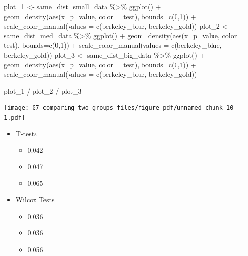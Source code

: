 \documentclass[
  letterpaper,
  DIV=11,
  numbers=noendperiod]{scrreprt}
\newenvironment{Shaded}{\begin{snugshade}}{\end{snugshade}}
\newcommand{\AttributeTok}[1]{\textcolor[rgb]{0.40,0.45,0.13}{#1}}
\newcommand{\DecValTok}[1]{\textcolor[rgb]{0.68,0.00,0.00}{#1}}
\newcommand{\FunctionTok}[1]{\textcolor[rgb]{0.28,0.35,0.67}{#1}}
\newcommand{\NormalTok}[1]{\textcolor[rgb]{0.00,0.23,0.31}{#1}}
\newcommand{\OtherTok}[1]{\textcolor[rgb]{0.00,0.23,0.31}{#1}}
\newcommand{\SpecialCharTok}[1]{\textcolor[rgb]{0.37,0.37,0.37}{#1}}
\providecommand{\tightlist}{%
  \setlength{\itemsep}{0pt}\setlength{\parskip}{0pt}}\usepackage{longtable,booktabs,array}
\begin{document}
\begin{Shaded}
\begin{Highlighting}[]
\NormalTok{plot\_1 }\OtherTok{\textless{}{-}}\NormalTok{ same\_dist\_small\_data }\SpecialCharTok{\%\textgreater{}\%}
  \FunctionTok{ggplot}\NormalTok{() }\SpecialCharTok{+}
  \FunctionTok{geom\_density}\NormalTok{(}\FunctionTok{aes}\NormalTok{(}\AttributeTok{x=}\NormalTok{p\_value, }\AttributeTok{color =}\NormalTok{ test), }\AttributeTok{bounds=}\FunctionTok{c}\NormalTok{(}\DecValTok{0}\NormalTok{,}\DecValTok{1}\NormalTok{)) }\SpecialCharTok{+}
  \FunctionTok{scale\_color\_manual}\NormalTok{(}\AttributeTok{values =} \FunctionTok{c}\NormalTok{(berkeley\_blue, berkeley\_gold))}
\NormalTok{plot\_2 }\OtherTok{\textless{}{-}}\NormalTok{ same\_dist\_med\_data }\SpecialCharTok{\%\textgreater{}\%}
  \FunctionTok{ggplot}\NormalTok{() }\SpecialCharTok{+}
  \FunctionTok{geom\_density}\NormalTok{(}\FunctionTok{aes}\NormalTok{(}\AttributeTok{x=}\NormalTok{p\_value, }\AttributeTok{color =}\NormalTok{ test), }\AttributeTok{bounds=}\FunctionTok{c}\NormalTok{(}\DecValTok{0}\NormalTok{,}\DecValTok{1}\NormalTok{)) }\SpecialCharTok{+}
  \FunctionTok{scale\_color\_manual}\NormalTok{(}\AttributeTok{values =} \FunctionTok{c}\NormalTok{(berkeley\_blue, berkeley\_gold))}
\NormalTok{plot\_3 }\OtherTok{\textless{}{-}}\NormalTok{ same\_dist\_big\_data }\SpecialCharTok{\%\textgreater{}\%}
  \FunctionTok{ggplot}\NormalTok{() }\SpecialCharTok{+}
  \FunctionTok{geom\_density}\NormalTok{(}\FunctionTok{aes}\NormalTok{(}\AttributeTok{x=}\NormalTok{p\_value, }\AttributeTok{color =}\NormalTok{ test), }\AttributeTok{bounds=}\FunctionTok{c}\NormalTok{(}\DecValTok{0}\NormalTok{,}\DecValTok{1}\NormalTok{)) }\SpecialCharTok{+}
  \FunctionTok{scale\_color\_manual}\NormalTok{(}\AttributeTok{values =} \FunctionTok{c}\NormalTok{(berkeley\_blue, berkeley\_gold))}

\NormalTok{plot\_1 }\SpecialCharTok{/}\NormalTok{ plot\_2 }\SpecialCharTok{/}\NormalTok{ plot\_3}
\end{Highlighting}
\end{Shaded}

\texttt{[image: 07-comparing-two-groups\_files/figure-pdf/unnamed-chunk-10-1.pdf]}

\begin{itemize}
\tightlist
\item
  T-tests

  \begin{itemize}
  \tightlist
  \item
    0.042
  \item
    0.047
  \item
    0.065
  \end{itemize}
\item
  Wilcox Tests

  \begin{itemize}
  \tightlist
  \item
    0.036
  \item
    0.036
  \item
    0.056
  \end{itemize}
\end{itemize}
\end{document}
